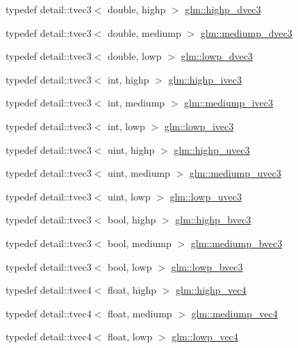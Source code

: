 \begin{CompactItemize}
\item 
typedef detail::tvec3$<$ double, highp $>$ \hyperlink{group__core__precision_g4962711854156dae8ebb4eb39237c542}{glm::highp\_\-dvec3}
\item 
typedef detail::tvec3$<$ double, mediump $>$ \hyperlink{group__core__precision_gc051f0702cb0e717db5dd913f6261388}{glm::mediump\_\-dvec3}
\item 
typedef detail::tvec3$<$ double, lowp $>$ \hyperlink{group__core__precision_g9bdb864f7242863e1227e3209f5b2dc4}{glm::lowp\_\-dvec3}
\item 
typedef detail::tvec3$<$ int, highp $>$ \hyperlink{group__core__precision_ge9f0a321de8ee92dce9d4400362d71e7}{glm::highp\_\-ivec3}
\item 
typedef detail::tvec3$<$ int, mediump $>$ \hyperlink{group__core__precision_g520d24fa0ea887284b80a02c062ca7b8}{glm::mediump\_\-ivec3}
\item 
typedef detail::tvec3$<$ int, lowp $>$ \hyperlink{group__core__precision_gd133fec5c629e3f712c1270e15144e6c}{glm::lowp\_\-ivec3}
\item 
typedef detail::tvec3$<$ uint, highp $>$ \hyperlink{group__core__precision_g66d0e4ae1742ede2eb32bf0bfedd7474}{glm::highp\_\-uvec3}
\item 
typedef detail::tvec3$<$ uint, mediump $>$ \hyperlink{group__core__precision_gebdefe98b08421ef645f65c706af46b2}{glm::mediump\_\-uvec3}
\item 
typedef detail::tvec3$<$ uint, lowp $>$ \hyperlink{group__core__precision_g26fd88e52fe7003d41b0c57c5edffd6e}{glm::lowp\_\-uvec3}
\item 
typedef detail::tvec3$<$ bool, highp $>$ \hyperlink{group__core__precision_g1d77a773fdd024602413670788c10c62}{glm::highp\_\-bvec3}
\item 
typedef detail::tvec3$<$ bool, mediump $>$ \hyperlink{group__core__precision_ge7c8d0136e829d6fe3feb00856e35f11}{glm::mediump\_\-bvec3}
\item 
typedef detail::tvec3$<$ bool, lowp $>$ \hyperlink{group__core__precision_g17ac2986f7b315a2ac4ee2662b5be9cb}{glm::lowp\_\-bvec3}
\item 
typedef detail::tvec4$<$ float, highp $>$ \hyperlink{group__core__precision_ge32d5f99860247afbe7ed90564bceac1}{glm::highp\_\-vec4}
\item 
typedef detail::tvec4$<$ float, mediump $>$ \hyperlink{group__core__precision_g2527a7f322907fecd58bef0a7a9c3ecd}{glm::mediump\_\-vec4}
\item 
typedef detail::tvec4$<$ float, lowp $>$ \hyperlink{group__core__precision_g706ad1296c1cdcbd26c815fbb0f3f846}{glm::lowp\_\-vec4}

\end{CompactItemize}
